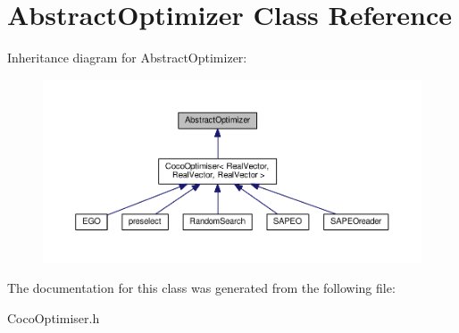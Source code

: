 \hypertarget{classAbstractOptimizer}{}\section{Abstract\+Optimizer Class Reference}
\label{classAbstractOptimizer}


Inheritance diagram for Abstract\+Optimizer\+:\nopagebreak
\begin{figure}[H]
\begin{center}
\leavevmode
\includegraphics[width=350pt]{classAbstractOptimizer__inherit__graph}
\end{center}
\end{figure}


The documentation for this class was generated from the following file\+:\begin{DoxyCompactItemize}
\item 
Coco\+Optimiser.\+h\end{DoxyCompactItemize}
